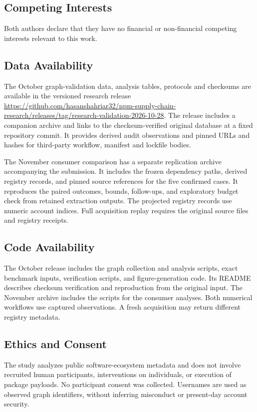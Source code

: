 \documentclass[11pt,a4paper]{article}
\begin{document}
\subsection*{Competing Interests}
Both authors declare that they have no financial or non-financial competing interests relevant to this work.

\subsection*{Data Availability}
\providecommand{\ArtifactAccessStatement}{The October graph-validation data, analysis tables, protocols and checksums are available in the versioned research release \url{https://github.com/hasanshahriar32/npm-supply-chain-research/releases/tag/research-validation-2026-10-28}. The release includes a companion archive and links to the checksum-verified original database at a fixed repository commit. It provides derived audit observations and pinned URLs and hashes for third-party workflow, manifest and lockfile bodies.}
\ArtifactAccessStatement

The November consumer comparison has a separate replication archive
accompanying the submission. It includes the frozen dependency paths,
derived registry records, and pinned source references for the five
confirmed cases. It reproduces the paired outcomes, bounds, follow-ups,
and exploratory budget check from retained extraction outputs. The
projected registry records use numeric account indices. Full acquisition
replay requires the original source files and registry receipts.

\subsection*{Code Availability}
The October release includes the graph collection and analysis scripts, exact benchmark inputs, verification scripts, and figure-generation code. Its README describes checksum verification and reproduction from the original input. The November archive includes the scripts for the consumer analyses. Both numerical workflows use captured observations. A fresh acquisition may return different registry metadata.

\subsection*{Ethics and Consent}
The study analyzes public software-ecosystem metadata and does not involve recruited human participants, interventions on individuals, or execution of package payloads. No participant consent was collected. Usernames are used as observed graph identifiers, without inferring misconduct or present-day account security.
\end{document}
